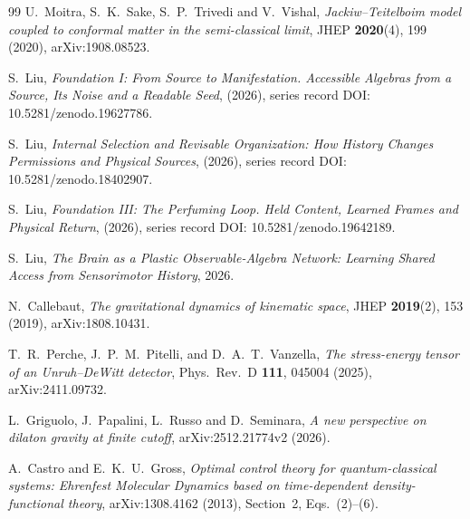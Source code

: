 \documentclass[12pt,a4paper]{article}
\begin{document}
\begin{thebibliography}{99}
U.~Moitra, S.~K.~Sake, S.~P.~Trivedi and V.~Vishal, \emph{Jackiw--Teitelboim model coupled to conformal matter in the semi-classical limit}, JHEP \textbf{2020}(4), 199 (2020), arXiv:1908.08523.

S.~Liu, \emph{Foundation I: From Source to Manifestation. Accessible Algebras from a Source, Its Noise and a Readable Seed}, (2026), series record DOI: 10.5281/zenodo.19627786.

S.~Liu, \emph{Internal Selection and Revisable Organization: How History
Changes Permissions and Physical Sources}, (2026),
series record DOI: 10.5281/zenodo.18402907.

S.~Liu, \emph{Foundation III: The Perfuming Loop. Held Content,
Learned Frames and Physical Return}, (2026),
series record DOI: 10.5281/zenodo.19642189.

S.~Liu, \emph{The Brain as a Plastic Observable-Algebra Network:
Learning Shared Access from Sensorimotor History}, 2026.

N.~Callebaut, \emph{The gravitational dynamics of kinematic space}, JHEP \textbf{2019}(2), 153 (2019), arXiv:1808.10431.

T.~R.~Perche, J.~P.~M.~Pitelli, and D.~A.~T.~Vanzella, \emph{The stress-energy tensor of an Unruh--DeWitt detector}, Phys.\ Rev.\ D \textbf{111}, 045004 (2025), arXiv:2411.09732.

L.~Griguolo, J.~Papalini, L.~Russo and D.~Seminara,
\emph{A new perspective on dilaton gravity at finite cutoff},
arXiv:2512.21774v2 (2026).

A.~Castro and E.~K.~U.~Gross,
\emph{Optimal control theory for quantum-classical systems: Ehrenfest
Molecular Dynamics based on time-dependent density-functional theory},
arXiv:1308.4162 (2013), Section~2, Eqs.~(2)--(6).

\end{thebibliography}
\end{document}
